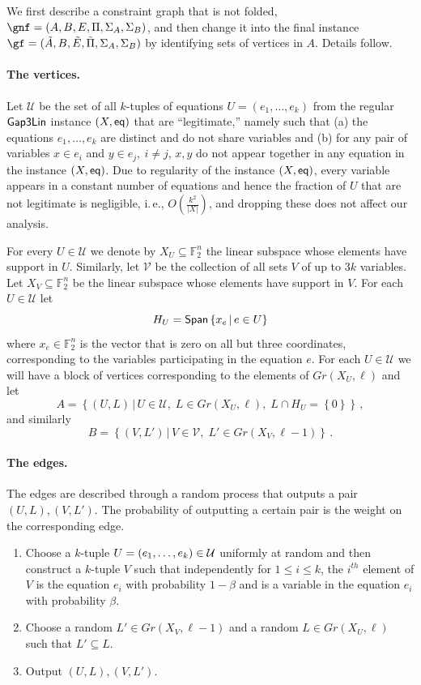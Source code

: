 \documentclass[11pt]{article}
\numberwithin{equation}{section}
\theoremstyle{definition}
\theoremstyle{plain}
\newcommand{\ie}{i.\,e.}
\newcommand\set[1]{{\left\{ #1 \right\}}}
\newcommand\Set[2]{ \left\{ #1 \,  \vert  \, #2\right\} }
\newcommand\spn{{\sf Span}}
\renewcommand\leq{\leqslant}
\renewcommand\subset{\subseteq}
\def\F{\mathbb{F}}
\def\U{\mathcal{U}}
\def\V{\mathcal{V}}
\begin{document}
We first describe a constraint graph that is not folded, $\gnf = (A,B,E,\Pi,\Sigma_A,\Sigma_B)$, and then change it into the final instance $\gf = (\tilde A,B,\tilde E,\tilde \Pi,\Sigma_A,\Sigma_B)$ by identifying sets of vertices in $A$. Details follow.

\paragraph{The vertices.}
Let $\U$ be the set of all $k$-tuples of equations
$U = (e_1, \ldots, e_k)$ from the regular ${\sf Gap3Lin}$ instance
$(X, {\sf eq})$ that are ``legitimate,'' namely  such that (a) the
equations $e_1, \ldots, e_k$ are distinct and do not share variables
and (b) for any pair of variables $x \in e_i$ and
$y \in e_j, ~i\not= j$, $x, y$ do not appear together in any equation
in the instance $(X, {\sf eq})$. Due to regularity of the instance
$(X, {\sf eq})$, every variable appears in a constant number of
equations and hence the fraction of $U$ that are not legitimate is
negligible, \ie, $O(\frac{k^2}{|X|})$, and dropping these does not
affect our analysis.

For every $U\in \U$ we denote by
$X_U\subset \F_2^{n}$ the linear subspace  whose elements have support in $U$.
Similarly, let $\V$ be the collection of all sets $V$ of up to $3k$ variables. Let $X_V\subset \F_2^{n}$ be the linear subspace  whose elements have support in $V$. For each $U\in \U$ let
\[ H_U = \spn\Set{x_e}{e\in U} \]
where $x_e\in \F_2^{n}$ is the vector that is zero on all but three coordinates, corresponding to the variables participating in the equation $e$.
For each $U\in \U$ we will have a block of vertices corresponding to
the elements of $Gr(X_U,\ell)$ and let
\[ A = \Set { (U,L) }{ U\in \U,\; L \in  Gr(X_U,\ell), \; L\cap H_U = \set 0}\,,\]
and similarly
\[ B = \Set { (V,L') }{ V\in \V,\; L' \in  Gr(X_V,\ell-1) }\,.\]

\paragraph{The edges.}
The edges are described through a random process that outputs a pair $(U,L),(V,L')$. The probability of outputting a certain pair is the weight on the corresponding edge.
\begin{enumerate}
\item  Choose a $k$-tuple $U = (e_1,\ldots, e_k) \in {\cal U}$ uniformly at random
 and then construct a $k$-tuple $V$ such that independently for $1 \leq i \leq k$, the $i^{th}$ element of
 $V$ is the equation $e_i$ with probability $1-\beta$ and is a variable in the equation $e_i$ with probability $\beta$.
\item Choose a random $L' \in Gr(X_V,\ell-1)$ and a random $L\in Gr(X_U,\ell)$ such that $L'\subset L$.
\item Output $(U,L),(V,L')$.
\end{enumerate}
\end{document}
